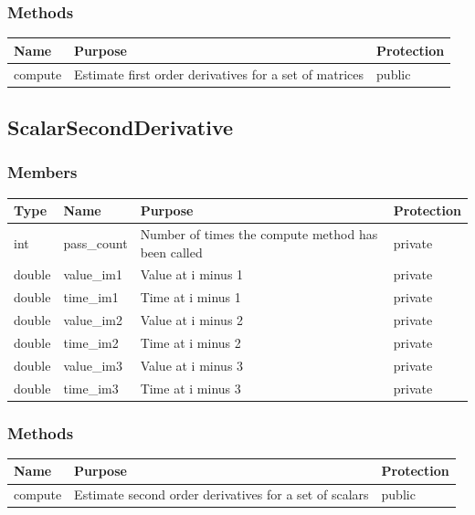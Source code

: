 \documentclass{report}
\begin{document}
\subsubsection{Methods}
\begin{center}
\begin{longtable}{|p{3cm}|p{10cm}|l|} \hline
\textbf{Name} & \textbf{Purpose} & \textbf{Protection} \\
\hline
\endhead
compute & Estimate first order derivatives for a set of matrices & public \\
\hline    
\end{longtable}
\end{center}

\subsection{ScalarSecondDerivative}
\subsubsection{Members}

\begin{center}
\begin{longtable}{|p{2.75cm}|p{2.8cm}|p{7.1cm}|l|} \hline
\textbf{Type} & \textbf{Name} & \textbf{Purpose} & \textbf{Protection} \\ 
\hline  
int & pass\_count & Number of times the compute method has been called & private \\ 
\hline
double & value\_im1 & Value at i minus 1 & private \\ 
\hline
double & time\_im1 & Time at i minus 1 & private \\ 
\hline
double & value\_im2 & Value at i minus 2 & private \\ 
\hline
double & time\_im2 & Time at i minus 2 & private \\
\hline 
double & value\_im3 & Value at i minus 3 & private \\
\hline
double & time\_im3 & Time at i minus 3 & private \\
\hline
    
\end{longtable}
\end{center}

\subsubsection{Methods}
\begin{center}
\begin{longtable}{|p{3cm}|p{10cm}|l|} \hline
\textbf{Name} & \textbf{Purpose} & \textbf{Protection} \\
\hline
\endhead
compute & Estimate second order derivatives for a set of scalars & public \\
\hline
\end{longtable}
\end{center}
\end{document}
